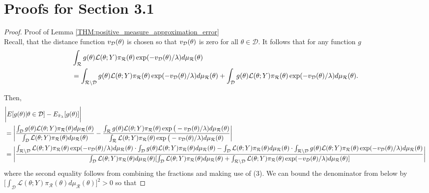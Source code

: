 \documentclass[10pt,fleqn]{article} \pdfoutput=1
\DeclareMathOperator{\1}{\mathbbm{1}} \DeclareMathOperator{\bigO}{\mc O}
\begin{document}
\appendix



\section{Proofs for Section 3.1}
\label{APP:Positive_Measure_Convergence_Proofs} \begin{proof}{Proof of
		Lemma \ref{THM:positive_measure_approximation_error}} \\ Recall,
	that the distance function $v_{\mathcal{D}}(\theta)$ is chosen so that
	$v_{\mathcal{D}}(\theta)$ is zero for all $\theta\in \mathcal{D}$. It follows
	that for any function $g$ \begin{equation} \begin{split}
			&\int_{\mathcal{R}}  g(\theta)
			\mathcal{L}(\theta;Y)\pi_\mathcal{R}(\theta)\exp(-v_{\mathcal{D}}(\theta)/\lambda)
			d\mu_\mathcal{R}(\theta) \\ &=  \int_{\mathcal{R}\setminus
				\mathcal{D}}g(\theta)
			\mathcal{L}(\theta;Y)\pi_\mathcal{R}(\theta)\exp(-v_{\mathcal{D}}(\theta)/\lambda)
			d\mu_\mathcal{R}(\theta) + \int_{ \mathcal{D}} g(\theta)
			\mathcal{L}(\theta;Y)\pi_\mathcal{R}(\theta)\exp(-v_{\mathcal{D}}(\theta)/\lambda)
			d\mu_\mathcal{R}(\theta) .  \end{split} \end{equation}

	Then, \begin{align*}  & \bigg|
		E[g(\theta)|\theta\in\mathcal{D}]-E_{\tilde{\pi}_\lambda}[g(\theta)]\bigg|
		\\ &= \bigg|\frac{ \int_\mathcal{D} g(\theta)
			\mathcal{L}(\theta;Y)\pi_\mathcal{R}(\theta)d\mu_\mathcal{R}(\theta)}{\int_\mathcal{D}
			\mathcal{L}(\theta;Y)\pi_\mathcal{R}(\theta)d\mu_\mathcal{R}(\theta)}
		- \frac{\int_{\mathcal{R}} g(\theta)
			\mathcal{L}(\theta;Y)\pi_\mathcal{R}(\theta)\exp\big(-v_{\mathcal{D}}(\theta)/\lambda)d\mu_\mathcal{R}(\theta)}{\int_{\mathcal{R}}
			\mathcal{L}(\theta;Y)\pi_\mathcal{R}(\theta)\exp\big(-v_{\mathcal{D}}(\theta)/\lambda)d\mu_\mathcal{R}(\theta)}
		\bigg|    \\ & =
		\bigg|\frac{\int_{\mathcal{R}\setminus
				\mathcal{D}}
			\mathcal{L}(\theta;Y)\pi_\mathcal{R}(\theta)\exp(-v_{\mathcal{D}}(\theta)/\lambda
			) d\mu_\mathcal{R}(\theta) \cdot \int_\mathcal{D}g(\theta)
			\mathcal{L}(\theta;Y)\pi_\mathcal{R}(\theta)d\mu_\mathcal{R}(\theta)-\int_\mathcal{D}\mathcal{L}(\theta;Y)\pi_\mathcal{R}(\theta)d\mu_\mathcal{R}(\theta)
			\cdot \int_{\mathcal{R}\setminus \mathcal{D} } g(\theta)
			\mathcal{L}(\theta;Y)\pi_\mathcal{R}(\theta)\exp(-v_{\mathcal{D}}(\theta)/\lambda)
			d\mu_\mathcal{R}(\theta)}{\int_\mathcal{D}
			\mathcal{L}(\theta;Y)\pi_\mathcal{R}(\theta)d\mu_\mathcal{R}(\theta)[\int_\mathcal{D}
				\mathcal{L}(\theta;Y)\pi_\mathcal{R}(\theta)d\mu_\mathcal{R}(\theta) +
				\int_{\mathcal{R}\setminus\mathcal{D}}
				\mathcal{L}(\theta;Y)\pi_\mathcal{R}(\theta) \exp(-v_{\mathcal{D}}(\theta)/\lambda)
				d\mu_\mathcal{R}(\theta)] }  \bigg|\end{align*} where the second equality
	follows from combining the fractions and making use of (3). We can bound
	the denominator from below by  $ \big[\int_\mathcal{D}
			\mathcal{L}(\theta;Y)\pi_\mathcal{R}(\theta) d\mu_\mathcal{R}(\theta)
			\big]^2>0$ so that


\end{proof}
\end{document}
